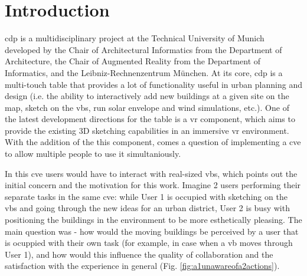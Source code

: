 
\chapter{Introduction}

\gls{cdp} is a multidisciplinary project at the Technical University of Munich developed by the Chair of Architectural Informatics from the Department of Architecture, the Chair of Augmented Reality from the Department of Informatics, and the Leibniz-Rechnenzentrum M{\"u}nchen.
At its core, \gls{cdp} is a multi-touch table \cite[p.~5]{lampe_cdp//vr-sketching_2017} that provides a lot of  functionality useful in urban planning and design (i.e. the ability to interactively add new buildings at a given site on the map, sketch on the \gls{vb}s, run solar envelope and wind simulations, etc.). One of the latest  development directions for the table is a \gls{vr} component, which aims to provide the existing 3D sketching capabilities in an immersive \gls{vr} environment. With the addition of the this component, comes a question of implementing a \gls{cve} to allow multiple people to use it simultaniously.

In this \gls{cve} users would have to interact with real-sized \gls{vb}s, which points out the initial concern and the motivation for this work. Imagine 2 users performing their separate tasks in the same \gls{cve}: while User 1 is occupied with sketching on the \gls{vb}s and going through the new ideas for an urban district, User 2 is busy with positioning the buildings in the environment to be more esthetically pleasing. The main question was - how would the moving buildings be perceived by a user that is ocuppied with their own task (for example, in case when a \gls{vb} moves through User 1), and how would this influence the quality of collaboration and the satisfaction with the experience in general (Fig. \ref{fig:a1unawareofa2actions}).  

